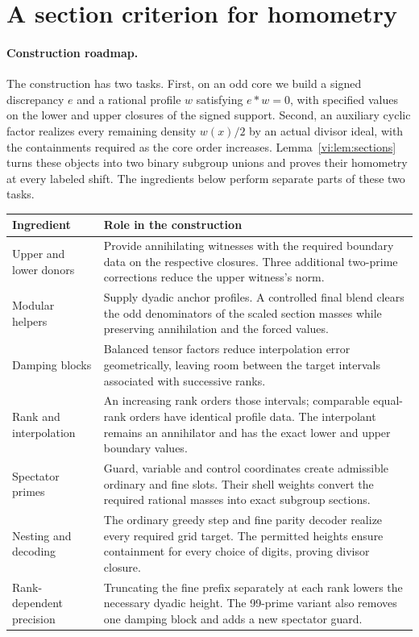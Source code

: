 \section{A section criterion for homometry}\label{vi:sec:reduce}

\paragraph{Construction roadmap.}
The construction has two tasks. First, on an odd core we build a signed
discrepancy $e$ and a rational profile $w$ satisfying $e*w=0$, with
specified values on the lower and upper closures of the signed support.
Second, an auxiliary cyclic factor realizes every remaining density
$w(x)/2$ by an actual divisor ideal, with the containments required as the
core order increases. Lemma~\ref{vi:lem:sections} turns these objects into
two binary subgroup unions and proves their homometry at every labeled
shift. The ingredients below perform separate parts of these two tasks.
\begin{center}\small
\begin{tabular}{@{}>{\raggedright\arraybackslash}p{.23\linewidth}
                    >{\raggedright\arraybackslash}p{.69\linewidth}@{}}
\toprule
Ingredient & Role in the construction\\\midrule
Upper and lower donors &
Provide annihilating witnesses with the required boundary data on the
respective closures. Three additional two-prime corrections reduce the
upper witness's norm.\\[.35em]
Modular helpers &
Supply dyadic anchor profiles. A controlled final blend clears the odd
denominators of the scaled section masses while preserving annihilation
and the forced values.\\[.35em]
Damping blocks &
Balanced tensor factors reduce interpolation error geometrically, leaving
room between the target intervals associated with successive ranks.\\[.35em]
Rank and interpolation &
An increasing rank orders those intervals; comparable equal-rank orders
have identical profile data. The interpolant remains an annihilator and
has the exact lower and upper boundary values.\\[.35em]
Spectator primes &
Guard, variable and control coordinates create admissible ordinary and
fine slots. Their shell weights convert the required rational masses into
exact subgroup sections.\\[.35em]
Nesting and decoding &
The ordinary greedy step and fine parity decoder realize every required
grid target. The permitted heights ensure containment for every choice
of digits, proving divisor closure.\\[.35em]
Rank-dependent precision &
Truncating the fine prefix separately at each rank lowers the necessary
dyadic height. The 99-prime variant also removes one damping block and
adds a new spectator guard.\\
\bottomrule
\end{tabular}
\end{center}
